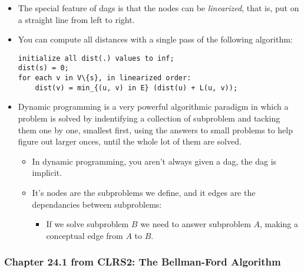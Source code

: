 \documentclass[a4paper,11pt]{article}
\begin{document}
\begin{itemize}
\item
  The special feature of dags is that the nodes can be
  \emph{linearized}, that is, put on a straight line from left to right.
\item
  You can compute all distances with a single pass of the following
  algorithm:

\begin{verbatim}
initialize all dist(.) values to inf;
dist(s) = 0;
for each v in V\{s}, in linearized order:
    dist(v) = min_{(u, v) in E} (dist(u) + L(u, v));
\end{verbatim}
\item
  Dynamic programming is a very powerful algorithmic paradigm in which a
  problem is solved by indentifying a collection of subproblem and
  tacking them one by one, smallest first, using the answers to small
  problems to help figure out larger onces, until the whole lot of them
  are solved.

  \begin{itemize}
  \itemsep1pt\parskip0pt
  \item
    In dynamic programming, you aren't always given a dag, the dag is
    implicit.
  \item
    It's nodes are the subproblems we define, and it edges are the
    dependancies between subproblems:

    \begin{itemize}
    \itemsep1pt\parskip0pt
    \item
      If we solve subproblem $B$ we need to answer subproblem $A$,
      making a conceptual edge from $A$ to $B$.
    \end{itemize}
  \end{itemize}
\end{itemize}

\subsubsection{Chapter 24.1 from CLRS2: The Bellman-Ford
Algorithm}\label{chapter-24.1-from-clrs2-the-bellman-ford-algorithm}
\end{document}
